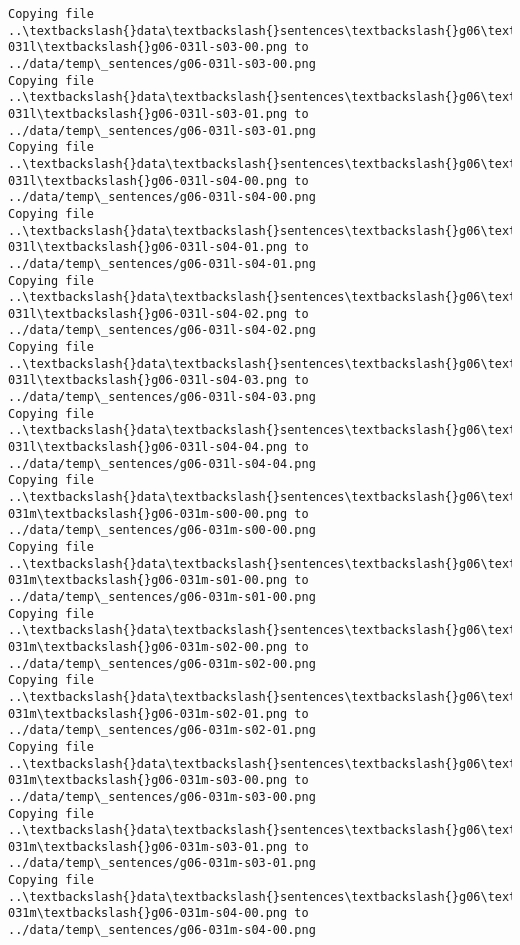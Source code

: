 \documentclass[11pt]{article}
\begin{document}
\begin{Verbatim}[commandchars=\\\{\}]
Copying file ..\textbackslash{}data\textbackslash{}sentences\textbackslash{}g06\textbackslash{}g06-031l\textbackslash{}g06-031l-s03-00.png to
../data/temp\_sentences/g06-031l-s03-00.png
Copying file ..\textbackslash{}data\textbackslash{}sentences\textbackslash{}g06\textbackslash{}g06-031l\textbackslash{}g06-031l-s03-01.png to
../data/temp\_sentences/g06-031l-s03-01.png
Copying file ..\textbackslash{}data\textbackslash{}sentences\textbackslash{}g06\textbackslash{}g06-031l\textbackslash{}g06-031l-s04-00.png to
../data/temp\_sentences/g06-031l-s04-00.png
Copying file ..\textbackslash{}data\textbackslash{}sentences\textbackslash{}g06\textbackslash{}g06-031l\textbackslash{}g06-031l-s04-01.png to
../data/temp\_sentences/g06-031l-s04-01.png
Copying file ..\textbackslash{}data\textbackslash{}sentences\textbackslash{}g06\textbackslash{}g06-031l\textbackslash{}g06-031l-s04-02.png to
../data/temp\_sentences/g06-031l-s04-02.png
Copying file ..\textbackslash{}data\textbackslash{}sentences\textbackslash{}g06\textbackslash{}g06-031l\textbackslash{}g06-031l-s04-03.png to
../data/temp\_sentences/g06-031l-s04-03.png
Copying file ..\textbackslash{}data\textbackslash{}sentences\textbackslash{}g06\textbackslash{}g06-031l\textbackslash{}g06-031l-s04-04.png to
../data/temp\_sentences/g06-031l-s04-04.png
Copying file ..\textbackslash{}data\textbackslash{}sentences\textbackslash{}g06\textbackslash{}g06-031m\textbackslash{}g06-031m-s00-00.png to
../data/temp\_sentences/g06-031m-s00-00.png
Copying file ..\textbackslash{}data\textbackslash{}sentences\textbackslash{}g06\textbackslash{}g06-031m\textbackslash{}g06-031m-s01-00.png to
../data/temp\_sentences/g06-031m-s01-00.png
Copying file ..\textbackslash{}data\textbackslash{}sentences\textbackslash{}g06\textbackslash{}g06-031m\textbackslash{}g06-031m-s02-00.png to
../data/temp\_sentences/g06-031m-s02-00.png
Copying file ..\textbackslash{}data\textbackslash{}sentences\textbackslash{}g06\textbackslash{}g06-031m\textbackslash{}g06-031m-s02-01.png to
../data/temp\_sentences/g06-031m-s02-01.png
Copying file ..\textbackslash{}data\textbackslash{}sentences\textbackslash{}g06\textbackslash{}g06-031m\textbackslash{}g06-031m-s03-00.png to
../data/temp\_sentences/g06-031m-s03-00.png
Copying file ..\textbackslash{}data\textbackslash{}sentences\textbackslash{}g06\textbackslash{}g06-031m\textbackslash{}g06-031m-s03-01.png to
../data/temp\_sentences/g06-031m-s03-01.png
Copying file ..\textbackslash{}data\textbackslash{}sentences\textbackslash{}g06\textbackslash{}g06-031m\textbackslash{}g06-031m-s04-00.png to
../data/temp\_sentences/g06-031m-s04-00.png

\end{Verbatim}
\end{document}
